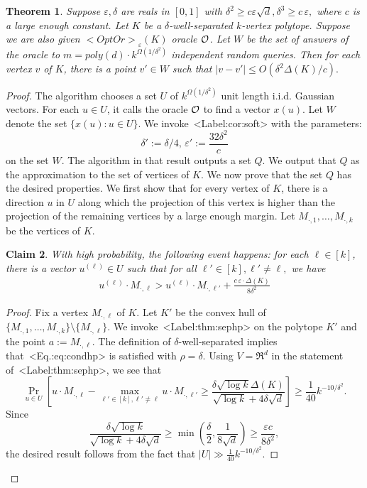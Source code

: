 \documentclass[11pt,letterpaper]{article}
\newcounter{note}[section]
\def\mathsf#1{<#1>}%
\def\Cref#1{<Label:#1>}%
\def\eqref#1{<Eq.:#1>}%
\newtheorem{theorem}{Theorem}[section]
\newtheorem{claim}[theorem]{Claim}
\theoremstyle{definition}
\theoremstyle{remark}
\newcommand{\Mdot}[1]{{M_{\cdot, #1}}}
\newcommand{\opto}{{\mathsf{OptOr}}}
\begin{document}
\begin{theorem}\label{upper-bound-1}
Suppose $\varepsilon,\delta$ are reals in $[0,1]$ with $\delta^2\geq c\varepsilon\sqrt d, \delta^3 \geq c \, \varepsilon,$ where $c$ is a large enough constant.  Let $K$ be a $\delta$-well-separated $k$-vertex polytope. Suppose we are also given  $ \opto_\varepsilon(K)$ oracle $\cal O$. 
Let $W$ be the set of answers of the oracle to $m=poly(d)\cdot k^{\Omega(1/\delta^2)}$ independent random queries. Then for each vertex $v$ of $K$, there is a point $v' \in W$ such that $|v-v'| \leq O(\delta^2 \Delta(K)/c).$
\end{theorem}
\begin{proof}
 The algorithm chooses a set $U$ of $k^{\Omega(1/\delta^2)}$ unit length i.i.d. Gaussian vectors. For each $u\in U$, it calls the oracle $\cal O$ to find a vector $x(u)$. Let $W$ denote the set $\{x(u): u \in U\}$. We invoke~\Cref{cor:soft} with the parameters: 
$$ \delta' := \delta/4, \, \varepsilon' := \frac{32 \delta^2}{c}$$
on the set $W$. The algorithm in that result outputs a set $Q$. We output that $Q$ as the approximation to the set of vertices of $K$. We now prove that the set $Q$ has the desired properties. We first show that for every vertex of $K$, there is a direction $u$ in $U$ along which the projection of this vertex is higher than the projection of the remaining vertices by a large enough margin. 
Let $\Mdot{1}, \ldots, \Mdot{k}$ be the vertices of $K$. 
\begin{claim}
    \label{cl:ul}
    With high probability, the following event happens: for each $\ell \in [k]$, there is a vector $u^{(\ell)} \in U$ such that for all $\ell' \in [k], \ell' \neq \ell,$ we have
    \begin{align}
        \label{eq:100}
        u^{(\ell)}\cdot M_{\cdot, \ell}> u^{(\ell)}\cdot M_{\cdot, \ell'}+\frac{c \, \varepsilon \cdot \Delta(K)}{8 \delta^2}
    \end{align}
\end{claim}

\begin{proof}
    Fix a vertex $\Mdot{\ell}$ of $K$.  Let $K'$ be the convex hull of $\{\Mdot{1}, \ldots, \Mdot{k} \} \setminus \{\Mdot{\ell}\}.$ We invoke~\Cref{thm:sephp} on the polytope $K'$ and the point $a := \Mdot{\ell}$. The definition of $\delta$-well-separated implies that~\eqref{eq:condhp} is satisfied with $\rho = \delta$. Using $V = \Re^d$ in the statement of~\Cref{thm:sephp}, we see that $$\Pr_{u \in U} \left[ u \cdot \Mdot{\ell} - \max_{\ell' \in [k], \ell' \neq \ell} u \cdot \Mdot{\ell'} \geq \frac{\delta \sqrt{\log k} \Delta(K)}{\sqrt{\log k} + 4 \delta \sqrt{d}} \right] \geq \frac{1}{40} k^{-10/\delta^2}.$$
    Since 
    $$\frac{\delta \sqrt{\log k}}{\sqrt{\log k} + 4 \delta \sqrt{d}}  \geq \min \left( \frac{\delta}{2}, \frac{1}{8 \sqrt{d}} \right) \geq \frac{\varepsilon c}{8 \delta^2}, $$
    the desired result follows from the fact that $|U| \gg \frac{1}{40} k^{-10/\delta^2}.$
    

\end{proof}
\end{proof}
\end{document}
